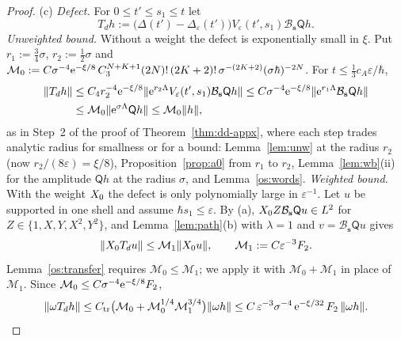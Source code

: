 \begin{proof}
\smallskip\noindent(c) \emph{Defect.} For $0\le t'\le s_1\le t$ let
\[
  T_dh:=\bigl(\Delta(t')-\Delta_\varepsilon(t')\bigr)V_\varepsilon(t',s_1)\mathcal B_{\mathbf s}\mathsf Qh .
\]
\emph{Unweighted bound.} Without a weight the defect is exponentially small in $\xi$. Put $r_1:=\tfrac34\sigma$, $r_2:=\tfrac12\sigma$ and
$\mathcal M_0:=C\sigma^{-4}\mathrm{e}^{-\xi/8}\,C_3^{N+K+1}(2N)!\,(2K+2)!\,\sigma^{-(2K+2)}(\sigma\hbar)^{-2N}$. For $t\le\tfrac13c_A\varepsilon/\hbar$,
\begin{align*}
  \lVert T_dh\rVert&\le C_4r_2^{-4}\mathrm{e}^{-\xi/8}\lVert \mathrm{e}^{r_2\Lambda}V_\varepsilon(t',s_1)\mathcal B_{\mathbf s}\mathsf Qh\rVert
  \le C\sigma^{-4}\mathrm{e}^{-\xi/8}\lVert \mathrm{e}^{r_1\Lambda}\mathcal B_{\mathbf s}\mathsf Qh\rVert\\
  &\le\mathcal M_0\lVert \mathrm{e}^{\sigma\Lambda}\mathsf Qh\rVert\le\mathcal M_0\lVert h\rVert,
\end{align*}
as in Step~2 of the proof of Theorem~\ref{thm:dd-appx}, where each step trades analytic radius for smallness or for a bound:
Lemma~\ref{lem:unw} at the radius $r_2$ (now $r_2/(8\varepsilon)=\xi/8$),
Proposition~\ref{prop:a0} from $r_1$ to $r_2$, Lemma~\ref{lem:wb}(ii) for the amplitude $\mathsf Qh$ at the radius $\sigma$, and
Lemma~\ref{os:words}.
\emph{Weighted bound.} With the weight $X_0$ the defect is only polynomially large in $\varepsilon^{-1}$. Let $u$ be supported in one shell and assume $\hbar s_1\le\varepsilon$. By (a), $X_0 Z\mathcal B_{\mathbf s}\mathsf Qu\in L^2$ for $Z\in\{1,X,Y,X^2,Y^2\}$, and
Lemma~\ref{lem:path}(b) with $\lambda=1$ and $v=\mathcal B_{\mathbf s}\mathsf Qu$ gives
\[
  \lVert X_0 T_du\rVert\le \mathcal M_1\lVert X_0 u\rVert,\qquad \mathcal M_1:=C\varepsilon^{-3}F_2 .
\]
Lemma~\ref{os:transfer} requires $\mathcal M_0\le \mathcal M_1$; we apply it with $\mathcal M_0+\mathcal M_1$ in place of $\mathcal M_1$. Since $\mathcal M_0\le C\sigma^{-4}\mathrm{e}^{-\xi/8}F_2$,
\begin{equation}\label{pc:defect}
  \lVert \omega T_dh\rVert\le C_{\mathrm{tr}}\bigl(\mathcal M_0+\mathcal M_0^{1/4}\mathcal M_1^{3/4}\bigr)\lVert \omega h\rVert\le C\,\varepsilon^{-3}\sigma^{-4}\,\mathrm{e}^{-\xi/32}\,F_2\,\lVert \omega h\rVert.
\end{equation}


\end{proof}
